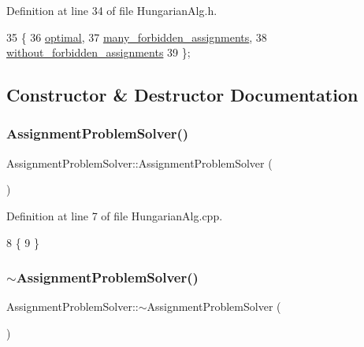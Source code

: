 Definition at line 34 of file Hungarian\+Alg.\+h.


\begin{DoxyCode}
35     \{
36         \mbox{\hyperlink{class_assignment_problem_solver_aec407eb73fed9d3ddb9467fde90a85e8a84f2334f61866dba64befa6910848d75}{optimal}},
37         \mbox{\hyperlink{class_assignment_problem_solver_aec407eb73fed9d3ddb9467fde90a85e8a226c2e4b79d0beeb342087880d97bb2a}{many\_forbidden\_assignments}},
38         \mbox{\hyperlink{class_assignment_problem_solver_aec407eb73fed9d3ddb9467fde90a85e8a3329e7571829a83b21be4821df62310d}{without\_forbidden\_assignments}}
39     \};
\end{DoxyCode}


\subsection{Constructor \& Destructor Documentation}
\mbox{\label{class_assignment_problem_solver_a13a83a34d4a0b4da872d87c79cb9c687}} 
\subsubsection{\texorpdfstring{Assignment\+Problem\+Solver()}{AssignmentProblemSolver()}}
{\footnotesize\ttfamily Assignment\+Problem\+Solver\+::\+Assignment\+Problem\+Solver (\begin{DoxyParamCaption}{ }\end{DoxyParamCaption})}



Definition at line 7 of file Hungarian\+Alg.\+cpp.


\begin{DoxyCode}
8 \{
9 \}
\end{DoxyCode}
\mbox{\label{class_assignment_problem_solver_a47317b69e3eb9b50426c427ebcf5770f}} 
\subsubsection{\texorpdfstring{$\sim$\+Assignment\+Problem\+Solver()}{~AssignmentProblemSolver()}}
{\footnotesize\ttfamily Assignment\+Problem\+Solver\+::$\sim$\+Assignment\+Problem\+Solver (\begin{DoxyParamCaption}{ }\end{DoxyParamCaption})}



